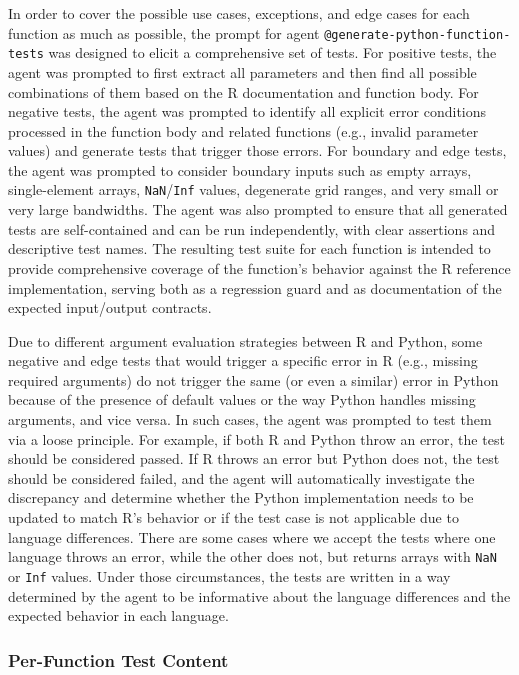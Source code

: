 \documentclass[12pt,a4paper]{article}
\begin{document}
In order to cover the possible use cases, exceptions, and edge cases for each function as much as possible, the prompt for agent \texttt{@generate-python-function-tests} was designed to elicit a comprehensive set of tests. For positive tests, the agent was prompted to first extract all parameters and then find all possible combinations of them based on the R documentation and function body. For negative tests, the agent was prompted to identify all explicit error conditions processed in the function body and related functions (e.g., invalid parameter values) and generate tests that trigger those errors. For boundary and edge tests, the agent was prompted to consider boundary inputs such as empty arrays, single-element arrays, \texttt{NaN}/\texttt{Inf} values, degenerate grid ranges, and very small or very large bandwidths. The agent was also prompted to ensure that all generated tests are self-contained and can be run independently, with clear assertions and descriptive test names. The resulting test suite for each function is intended to provide comprehensive coverage of the function's behavior against the R reference implementation, serving both as a regression guard and as documentation of the expected input/output contracts.

Due to different argument evaluation strategies between R and Python, some negative and edge tests that would trigger a specific error in R (e.g., missing required arguments) do not trigger the same (or even a similar) error in Python because of the presence of default values or the way Python handles missing arguments, and vice versa. In such cases, the agent was prompted to test them via a loose principle. For example, if both R and Python throw an error, the test should be considered passed. If R throws an error but Python does not, the test should be considered failed, and the agent will automatically investigate the discrepancy and determine whether the Python implementation needs to be updated to match R's behavior or if the test case is not applicable due to language differences. There are some cases where we accept the tests where one language throws an error, while the other does not, but returns arrays with \texttt{NaN} or \texttt{Inf} values. Under those circumstances, the tests are written in a way determined by the agent to be informative about the language differences and the expected behavior in each language.

\subsubsection{Per-Function Test Content}
\end{document}
